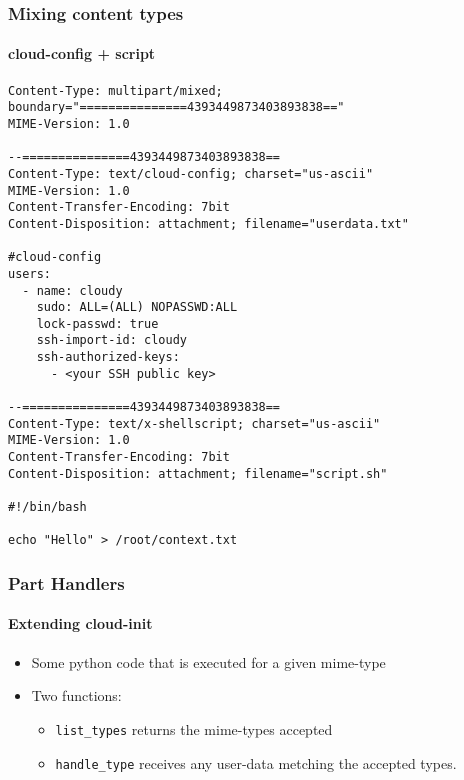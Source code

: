 \begin{frame}[fragile]
  \frametitle{Mixing content types}
  \framesubtitle{cloud-config + script}

  \begin{Sbox}
  \tiny
  \begin{minipage}{\linewidth-2\fboxsep-2\fboxrule-4pt}
  \color{white}
  \begin{verbatim}
Content-Type: multipart/mixed; boundary="===============4393449873403893838=="
MIME-Version: 1.0

--===============4393449873403893838==
Content-Type: text/cloud-config; charset="us-ascii"
MIME-Version: 1.0
Content-Transfer-Encoding: 7bit
Content-Disposition: attachment; filename="userdata.txt"

#cloud-config
users:
  - name: cloudy 
    sudo: ALL=(ALL) NOPASSWD:ALL
    lock-passwd: true
    ssh-import-id: cloudy 
    ssh-authorized-keys:
      - <your SSH public key>

--===============4393449873403893838==
Content-Type: text/x-shellscript; charset="us-ascii"
MIME-Version: 1.0
Content-Transfer-Encoding: 7bit
Content-Disposition: attachment; filename="script.sh"

#!/bin/bash

echo "Hello" > /root/context.txt
  \end{verbatim}
  \end{minipage}
  \end{Sbox}

\end{frame}


\begin{frame}
  \frametitle{Part Handlers}
  \framesubtitle{Extending cloud-init}

  \begin{itemize}
    \item Some python code that is executed for a given mime-type
    \item Two functions:
    \begin{itemize}
        \item \texttt{list\_types} returns the mime-types accepted
        \item \texttt{handle\_type} receives any user-data metching the
            accepted types.
    \end{itemize}
  \end{itemize}
\end{frame}

